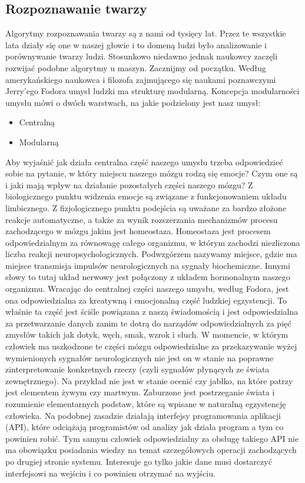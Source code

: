 \documentclass{article}
\begin{document}
\subsection{Rozpoznawanie twarzy}
\par
Algorytmy rozpoznawania twarzy są z nami od tysięcy lat. Przez te wszystkie lata działy się one w naszej głowie i to domeną ludzi było analizowanie i porównywanie twarzy ludzi. Stosunkowo niedawno jednak naukowcy zaczęli rozwijać podobne algorytmy u maszyn. Zacznijmy od początku. Według amerykańskiego naukowca i filozofa zajmującego się naukami poznawczymi Jerry'ego Fodora\cite{ref15} umysł ludzki ma strukturę modularną. Koncepcja modularności umysłu mówi o dwóch warstwach, na jakie podzielony jest nasz umysł:
\begin{itemize}
	\item Centralną
	\item Modularną
\end{itemize}
\par
Aby wyjaśnić jak działa centralna część naszego umysłu trzeba odpowiedzieć sobie na pytanie, w który miejscu naszego mózgu rodzą się emocje? Czym one są i jaki mają wpływ na działanie pozostałych części naszego mózgu? Z biologicznego punktu widzenia emocje są związane z funkcjonowaniem układu limbicznego. Z fizjologicznego punktu podejścia są uważane za bardzo złożone reakcje automatyczne, a także za wynik rozszerzania mechanizmów procesu zachodzącego w mózgu jakim jest homeostaza. Homeostaza jest procesem odpowiedzialnym za równowagę całego organizmu, w którym zachodzi niezliczona liczba reakcji neuropsychologicznych. Podwzgórzem nazywamy miejsce, gdzie ma miejsce transmisja impulsów neurologicznych na sygnały biochemiczne. Innymi słowy to tutaj układ nerwowy jest połączony z układem hormonalnym naszego organizmu. Wracając do centralnej części naszego umysłu, według Fodora, jest ona odpowiedzialna za kreatywną i emocjonalną część ludzkiej egzystencji. To właśnie ta część jest ściśle powiązana z naszą świadomością i jest odpowiedzialna za przetwarzanie danych zanim te dotrą do narządów odpowiedzialnych za pięć zmysłów takich jak dotyk, węch, smak, wzrok i słuch. W momencie, w którym człowiek ma uszkodzone te części mózgu odpowiedzialne za przekazywanie wyżej wymienionych sygnałów neurologicznych nie jest on w stanie na poprawne zinterpretowanie konkretnych rzeczy (czyli sygnałów płynących ze świata zewnętrznego). Na przykład nie jest w stanie ocenić czy jabłko, na które patrzy jest elementem żywym czy martwym. Zaburzone jest postrzeganie świata i rozumienie elementarnych podstaw, które są wpisane w naturalną egzystencję człowieka. Na podobnej zasadzie działają interfejsy programowania aplikacji (API), które odciążają programistów od analizy jak działa program a tym co powinien robić. Tym samym człowiek odpowiedzialny za obsługę takiego API nie ma obowiązku posiadania wiedzy na temat szczegółowych operacji zachodzących po drugiej stronie systemu. Interesuje go tylko jakie dane musi dostarczyć  interfejsowi na wejściu i co powinien otrzymać na wyjściu.
\end{document}
